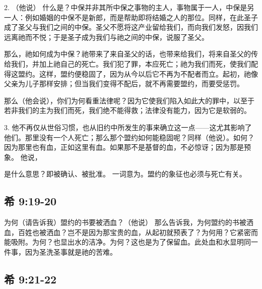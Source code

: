 2.  （他说） 什么是？中保并非其所中保之事物的主人，事物属于一人，中保是另一人：例如婚姻的中保不是新郎，而是帮助即将结婚之人的那位。同样，在此圣子成了圣父与我们之间的中保。圣父不愿将这产业留给我们，而向我们发怒，因我们远离祂而不悦；于是圣子成为我们与祂之间的中保，说服了圣父。\par

那么，祂如何成为中保？祂带来了来自圣父的话，也带来给我们，将来自圣父的传给我们，并加上祂自己的死亡。我们犯了罪，本应死亡；祂为我们而死，使我们配得这盟约。这样，盟约便稳固了，因为从今以后它不再为不配者而立。起初，祂像父亲为儿子那样安排；但当我们变得不配后，就不再需要盟约，而要受惩罚。\par

那么（他会说），你们为何看重法律呢？因为它使我们陷入如此大的罪中，以至于若非我们的主为我们而死，我们绝不能得救；法律没有能力，因为它是软弱的。\par

3. 他不再仅从世俗习惯，也从旧约中所发生的事来确立这一点——这尤其影响了他们。那里没有一个人死亡；那么那个盟约如何能稳固呢？同样（他说）。如何？因为那里也有血，正如这里有血。如果那不是基督的血，不必惊讶；因为那是预象。 他说，\par

 是什么意思？即被确认、被批准。 一词意为。盟约的象征也必须与死亡有关。\par


\subsection{希 9:19-20}

为何（请告诉我）盟约的书要被洒血？（他说） 那么告诉我，为何盟约的书被洒血，百姓也被洒血？岂不是因为那宝贵的血，从起初就预表了？为何用？它紧密而能吸附。为何？也显出水的洁净。为何？这也是为了保留血。此处血和水显明同一件事，因为圣洗圣事就是祂的苦难。\par


\subsection{希 9:21-22}

